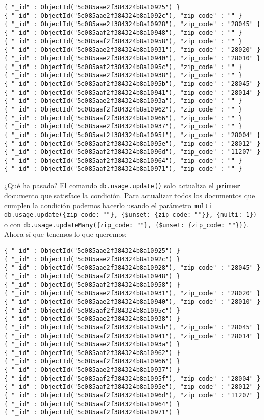 \documentclass[]{article}
\begin{document}
\begin{verbatim}
{ "_id" : ObjectId("5c085aae2f384324b8a10925") }
{ "_id" : ObjectId("5c085aae2f384324b8a1092c"), "zip_code" : "" }
{ "_id" : ObjectId("5c085aae2f384324b8a10928"), "zip_code" : "28045" }
{ "_id" : ObjectId("5c085aaf2f384324b8a10948"), "zip_code" : "" }
{ "_id" : ObjectId("5c085aaf2f384324b8a10958"), "zip_code" : "" }
{ "_id" : ObjectId("5c085aae2f384324b8a10931"), "zip_code" : "28020" }
{ "_id" : ObjectId("5c085aae2f384324b8a10940"), "zip_code" : "28010" }
{ "_id" : ObjectId("5c085aaf2f384324b8a1095c"), "zip_code" : "" }
{ "_id" : ObjectId("5c085aae2f384324b8a10938"), "zip_code" : "" }
{ "_id" : ObjectId("5c085aaf2f384324b8a1095b"), "zip_code" : "28045" }
{ "_id" : ObjectId("5c085aaf2f384324b8a10941"), "zip_code" : "28014" }
{ "_id" : ObjectId("5c085aae2f384324b8a1093a"), "zip_code" : "" }
{ "_id" : ObjectId("5c085aaf2f384324b8a10962"), "zip_code" : "" }
{ "_id" : ObjectId("5c085aaf2f384324b8a10966"), "zip_code" : "" }
{ "_id" : ObjectId("5c085aae2f384324b8a10937"), "zip_code" : "" }
{ "_id" : ObjectId("5c085aaf2f384324b8a1095f"), "zip_code" : "28004" }
{ "_id" : ObjectId("5c085aaf2f384324b8a1095e"), "zip_code" : "28012" }
{ "_id" : ObjectId("5c085aaf2f384324b8a1096d"), "zip_code" : "11207" }
{ "_id" : ObjectId("5c085aaf2f384324b8a10964"), "zip_code" : "" }
{ "_id" : ObjectId("5c085aaf2f384324b8a10971"), "zip_code" : "" }
\end{verbatim}

¿Qué ha pasado? El comando \texttt{db.usage.update()} solo actualiza el
\textbf{primer} documento que satisface la condición. Para actualizar
todos los documentos que cumplen la condición podemos hacerlo usando el
parámetro \texttt{multi}
\texttt{db.usage.update(\{zip\_code:\ ""\},\ \{\$unset:\ \{zip\_code:\ ""\}\},\ \{multi:\ 1\})}
o con
\texttt{db.usage.updateMany(\{zip\_code:\ ""\},\ \{\$unset:\ \{zip\_code:\ ""\}\})}.
Ahora sí que tenemos lo que queremos:

\begin{verbatim}
{ "_id" : ObjectId("5c085aae2f384324b8a10925") }
{ "_id" : ObjectId("5c085aae2f384324b8a1092c") }
{ "_id" : ObjectId("5c085aae2f384324b8a10928"), "zip_code" : "28045" }
{ "_id" : ObjectId("5c085aaf2f384324b8a10948") }
{ "_id" : ObjectId("5c085aaf2f384324b8a10958") }
{ "_id" : ObjectId("5c085aae2f384324b8a10931"), "zip_code" : "28020" }
{ "_id" : ObjectId("5c085aae2f384324b8a10940"), "zip_code" : "28010" }
{ "_id" : ObjectId("5c085aaf2f384324b8a1095c") }
{ "_id" : ObjectId("5c085aae2f384324b8a10938") }
{ "_id" : ObjectId("5c085aaf2f384324b8a1095b"), "zip_code" : "28045" }
{ "_id" : ObjectId("5c085aaf2f384324b8a10941"), "zip_code" : "28014" }
{ "_id" : ObjectId("5c085aae2f384324b8a1093a") }
{ "_id" : ObjectId("5c085aaf2f384324b8a10962") }
{ "_id" : ObjectId("5c085aaf2f384324b8a10966") }
{ "_id" : ObjectId("5c085aae2f384324b8a10937") }
{ "_id" : ObjectId("5c085aaf2f384324b8a1095f"), "zip_code" : "28004" }
{ "_id" : ObjectId("5c085aaf2f384324b8a1095e"), "zip_code" : "28012" }
{ "_id" : ObjectId("5c085aaf2f384324b8a1096d"), "zip_code" : "11207" }
{ "_id" : ObjectId("5c085aaf2f384324b8a10964") }
{ "_id" : ObjectId("5c085aaf2f384324b8a10971") }
\end{verbatim}
\end{document}
